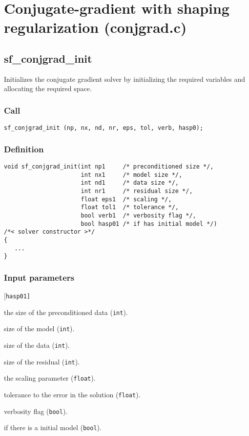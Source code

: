 \section{Conjugate-gradient with shaping regularization (conjgrad.c)}




\subsection{{sf\_conjgrad\_init}}
Initializes the conjugate gradient solver by initializing the required variables and allocating the required space.

\subsubsection*{Call}
\begin{verbatim}sf_conjgrad_init (np, nx, nd, nr, eps, tol, verb, hasp0);\end{verbatim}

\subsubsection*{Definition}
\begin{verbatim}
void sf_conjgrad_init(int np1     /* preconditioned size */, 
                      int nx1     /* model size */, 
                      int nd1     /* data size */, 
                      int nr1     /* residual size */, 
                      float eps1  /* scaling */,
                      float tol1  /* tolerance */, 
                      bool verb1  /* verbosity flag */, 
                      bool hasp01 /* if has initial model */) 
/*< solver constructor >*/
{
   ...
}
\end{verbatim}

\subsubsection*{Input parameters}
\begin{desclist}{\tt }{\quad}[\tt hasp01]
   \setlength\itemsep{0pt}
   \item[np1]    the size of the preconditioned data (\texttt{int}). 
   \item[nx1]    size of the model (\texttt{int}). 
   \item[nd1]    size of the data (\texttt{int}). 
   \item[nr1]    size of the residual (\texttt{int}). 
   \item[eps1]   the scaling parameter (\texttt{float}). 
   \item[tol1]   tolerance to the error in the solution  (\texttt{float}). 
   \item[verb1]  verbosity flag (\texttt{bool}). 
   \item[hasp01] if there is a initial model (\texttt{bool}).  
\end{desclist}




